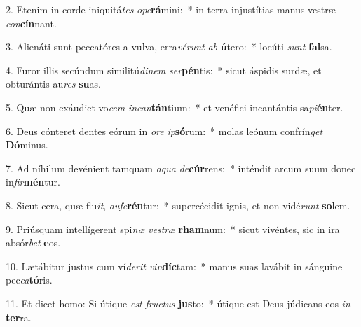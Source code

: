 2. Etenim in corde iniquitá\textit{tes} \textit{o}\textit{pe}\textbf{rá}mini:~*  in terra injustítias manus vestræ \textit{con}\textbf{cín}nant.\

3. Alienáti sunt peccatóres a vulva, erra\textit{vé}\textit{runt} \textit{ab} \textbf{ú}tero:~*  locúti \textit{sunt} \textbf{fal}sa.\

4. Furor illis secúndum similitú\textit{di}\textit{nem} \textit{ser}\textbf{pén}tis:~*  sicut áspidis surdæ, et obturántis au\textit{res} \textbf{su}as.\

5. Quæ non exáudiet vo\textit{cem} \textit{in}\textit{can}\textbf{tán}tium:~*  et venéfici incantántis sa\textit{pi}\textbf{én}ter.\

6. Deus cónteret dentes eórum in \textit{o}\textit{re} \textit{ip}\textbf{só}rum:~*  molas leónum confrín\textit{get} \textbf{Dó}minus.\

7. Ad níhilum devénient tamquam \textit{a}\textit{qua} \textit{de}\textbf{cúr}rens:~*  inténdit arcum suum donec in\textit{fir}\textbf{mén}tur.\

8. Sicut cera, quæ flu\textit{it}, \textit{au}\textit{fe}\textbf{rén}tur:~*  supercécidit ignis, et non vidé\textit{runt} \textbf{so}lem.\

9. Priúsquam intellígerent spi\textit{næ} \textit{ves}\textit{træ} \textbf{rham}num:~*  sicut vivéntes, sic in ira absór\textit{bet} \textbf{e}os.\

10. Lætábitur justus cum ví\textit{de}\textit{rit} \textit{vin}\textbf{díc}tam:~*  manus suas lavábit in sánguine pec\textit{ca}\textbf{tó}ris.\

11. Et dicet homo: Si útique \textit{est} \textit{fruc}\textit{tus} \textbf{jus}to:~*  útique est Deus júdicans eos \textit{in} \textbf{ter}ra.\

